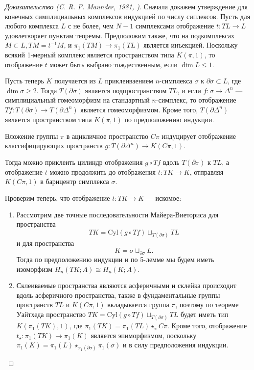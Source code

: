 \documentclass[14pt, dvipsnames]{extarticle}
\theoremstyle{definition}
\theoremstyle{remark}
\begin{document}
\begin{proof}[Доказательство {\normalfont (C. R. F. Maunder, 1981, \cite{Maunder})}]

Сначала докажем утверждение для конечных симплициальных комплексов индукцией по числу  сиплексов. Пусть для любого комплекса $L$ с не более, чем $N-1$ симплексами отображение $t:TL\to L$ удовлетворяет пунктам теоремы. Предположим также, что на подкомплексах $M\subset L, TM=t^{-1}M$, и $\pi_1(TM)\to \pi_1(TL)$ является инъекцией. Поскольку всякий 1-мерный комплекс является пространством типа $K(\pi, 1)$, то отображение $t$ может быть выбрано тождественным, если $\dim L\leqslant 1$.

Пусть теперь $K$ получается из $L$ приклеиваением $n$-симплекса $\sigma$ к $\partial\sigma\subset L$, где $\dim \sigma\geqslant 2$. Тогда $T(\partial\sigma)$ является подпространством $TL$, и если $f:\sigma\to \Delta^n$ --- симплициальный гомеоморфизм на стандартный $n$-симплекс, то отображение $Tf:T(\partial\sigma)\to T(\partial\Delta^n)$ является гомеоморфизмом. Кроме того, $T(\partial\Delta^n)$ является пространством типа $K(\pi, 1)$ по предположению индукции. 

Вложение группы $\pi$ в ацикличное пространство $C\pi$ индуцирует отображение классифицирующих пространств $g: T(\partial \Delta^n)\to K(C\pi, 1)$. 

Тогда можно приклеить цилиндр отображения $g\circ Tf$ вдоль $T(\partial\sigma)$ к $TL$, а отображение $t$ можно продолжить до отображения $t:TK\to K$, отправляя $K(C\pi, 1)$ в барицентр симплекса $\sigma$.

Проверим теперь, что отображение $t:TK\to K$ --- искомое:

\begin{enumerate}[\bf 1.]

\item Рассмотрим две точные последовательности Майера-Виеториса для пространства $$TK=\mathrm{Cyl}(g\circ Tf)\sqcup_{T(\partial\sigma)}TL$$ и для пространства $$K=\sigma\sqcup_{\partial \sigma}L.$$ Тогда по предположению индукции и по 5-лемме мы будем иметь изоморфизм $H_n(TK; A)\cong H_n(K; A)$.

\item  Склеиваемые пространства являются асферичными и склейка происходит вдоль асферичного пространства, также в фундаментальные группы пространств $TL$ и $K(C\pi, 1)$ вкладывается группа $\pi$, поэтому по теореме Уайтхеда пространство $TK=\mathrm{Cyl}(g\circ Tf)\sqcup_{T(\partial\sigma)}TL$ будет иметь тип $K(\pi_1(TK), 1)$, где $\pi_1(TK)=\pi_1(TL)\star_{\pi} C\pi$. Кроме того, отображение $t_\star: \pi_1(TK)\to \pi_1(K)$ является эпиморфизмом, поскольку $\pi_1(K)=\pi_1(L)\star_{\pi_1(\partial\sigma)}\pi_1(\sigma)$ и в силу предположения индукции. 


\end{enumerate}
\end{proof}
\end{document}

